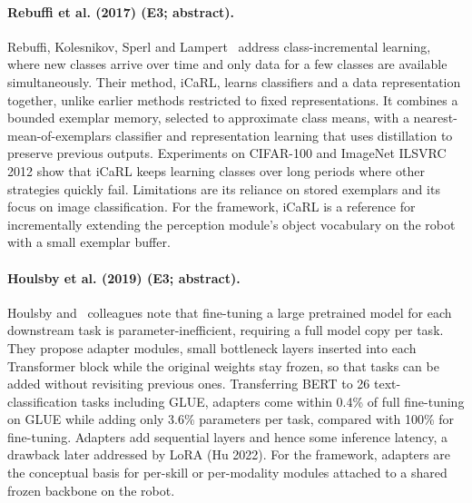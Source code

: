 \documentclass[10pt,a4paper]{article}
\begin{document}
\paragraph{Rebuffi et al. (2017) (E3; abstract).} Rebuffi, Kolesnikov, Sperl and Lampert~\cite{Rebuffi2017} address class-incremental learning, where new classes arrive over time and only data for a few classes are available simultaneously. Their method, iCaRL, learns classifiers and a data representation together, unlike earlier methods restricted to fixed representations. It combines a bounded exemplar memory, selected to approximate class means, with a nearest-mean-of-exemplars classifier and representation learning that uses distillation to preserve previous outputs. Experiments on CIFAR-100 and ImageNet ILSVRC 2012 show that iCaRL keeps learning classes over long periods where other strategies quickly fail. Limitations are its reliance on stored exemplars and its focus on image classification. For the framework, iCaRL is a reference for incrementally extending the perception module's object vocabulary on the robot with a small exemplar buffer.

\paragraph{Houlsby et al. (2019) (E3; abstract).} Houlsby and~\cite{Houlsby2019} colleagues note that fine-tuning a large pretrained model for each downstream task is parameter-inefficient, requiring a full model copy per task. They propose adapter modules, small bottleneck layers inserted into each Transformer block while the original weights stay frozen, so that tasks can be added without revisiting previous ones. Transferring BERT to 26 text-classification tasks including GLUE, adapters come within 0.4\% of full fine-tuning on GLUE while adding only 3.6\% parameters per task, compared with 100\% for fine-tuning. Adapters add sequential layers and hence some inference latency, a drawback later addressed by LoRA (Hu 2022). For the framework, adapters are the conceptual basis for per-skill or per-modality modules attached to a shared frozen backbone on the robot.
\end{document}
